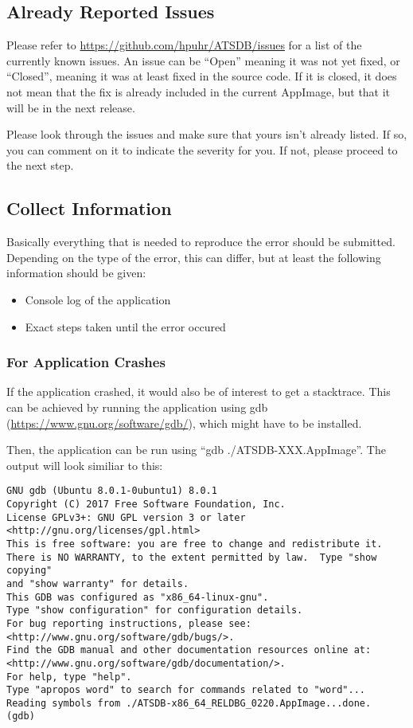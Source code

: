\subsection{Already Reported Issues}

Please refer to \url{https://github.com/hpuhr/ATSDB/issues} for a list of the currently known issues. An issue can be ``Open'' meaning it was not yet fixed, or ``Closed'', meaning it was at least fixed in the source code. If it is closed, it does not mean that the fix is already included in the current AppImage, but that it will be in the next release.

Please look through the issues and make sure that yours isn't already listed. If so, you can comment on it to indicate the severity for you. If not, please proceed to the next step.

\subsection{Collect Information}

Basically everything that is needed to reproduce the error should be submitted. Depending on the type of the error, this can differ, but at least the following information should be given:

\begin{itemize}  
\item Console log of the application
\item Exact steps taken until the error occured
\end{itemize} 

\subsubsection{For Application Crashes}

If the application crashed, it would also be of interest to get a stacktrace. This can be achieved by running the application using gdb (\url{https://www.gnu.org/software/gdb/}), which might have to be installed.

Then, the application can be run using ``gdb ./ATSDB-XXX.AppImage''. The output will look similiar to this:

\begin{verbatim}
GNU gdb (Ubuntu 8.0.1-0ubuntu1) 8.0.1
Copyright (C) 2017 Free Software Foundation, Inc.
License GPLv3+: GNU GPL version 3 or later <http://gnu.org/licenses/gpl.html>
This is free software: you are free to change and redistribute it.
There is NO WARRANTY, to the extent permitted by law.  Type "show copying"
and "show warranty" for details.
This GDB was configured as "x86_64-linux-gnu".
Type "show configuration" for configuration details.
For bug reporting instructions, please see:
<http://www.gnu.org/software/gdb/bugs/>.
Find the GDB manual and other documentation resources online at:
<http://www.gnu.org/software/gdb/documentation/>.
For help, type "help".
Type "apropos word" to search for commands related to "word"...
Reading symbols from ./ATSDB-x86_64_RELDBG_0220.AppImage...done.
(gdb) 
\end{verbatim}


